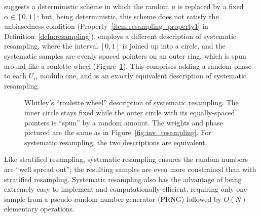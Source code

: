 \textcite{kitagawa1996} suggests a deterministic scheme in which the random $u$ is replaced by a fixed $\alpha\in[0,1]$; but, being deterministic, this scheme does not satisfy the unbiasedness condition (Property~\ref{item:resampling_property1} in Definition~\ref{defn:resampling}).
\textcite{whitley1994} employs a different description of systematic resampling, where the interval $[0,1]$ is joined up into a circle, and the systematic samples are evenly spaced pointers on an outer ring, which is spun around like a roulette wheel (Figure~\ref{fig:roulettewheel}). This comprises adding a random phase to each $U_i$, modulo one, and is an exactly equivalent description of systematic resampling.

\begin{figure}[ht]
\centering
{}
\caption[Whitley's roulette wheel]{Whitley's ``roulette wheel'' description of systematic resampling. The inner circle stays fixed while the outer circle with its equally-spaced pointers is ``spun'' by a random amount. The weights and phase pictured are the same as in Figure~\ref{fig:inv_resampling}. For systematic resampling, the two descriptions are equivalent.}
\label{fig:roulettewheel}
\end{figure}

Like stratified resampling, systematic resampling ensures the random numbers are ``well spread out''; the resulting samples are even more constrained than with stratified resampling. 
Systematic resampling also has the advantage of being extremely easy to implement and computationally efficient, requiring only one sample from a pseudo-random number generator (PRNG) followed by $O(N)$ elementary operations.

